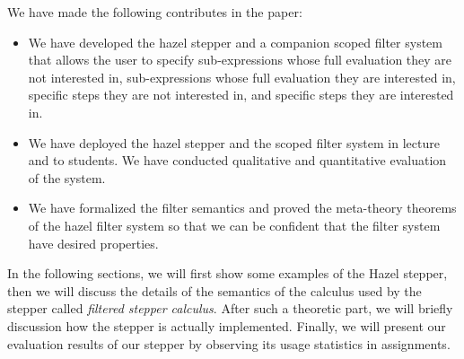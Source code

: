 
We have made the following contributes in the paper:
\begin{itemize}
  \item We have developed the hazel stepper and a companion scoped filter system
    that allows the user to specify sub-expressions whose full evaluation they
    are not interested in, sub-expressions whose full evaluation they are
    interested in, specific steps they are not interested in, and specific steps
    they are interested in.
  \item We have deployed the hazel stepper and the scoped filter system in
    lecture and to students. We have conducted qualitative and quantitative
    evaluation of the system.
  \item We have formalized the filter semantics and proved the meta-theory
    theorems of the hazel filter system so that we can be confident that the
    filter system have desired properties.
\end{itemize}

In the following sections, we will first show some examples of the
Hazel stepper, then we will discuss the details of the semantics of
the calculus used by the stepper called \emph{filtered stepper
  calculus}. After such a theoretic part, we will briefly discussion
how the stepper is actually implemented. Finally, we will present our
evaluation results of our stepper by observing its usage statistics in
assignments.


